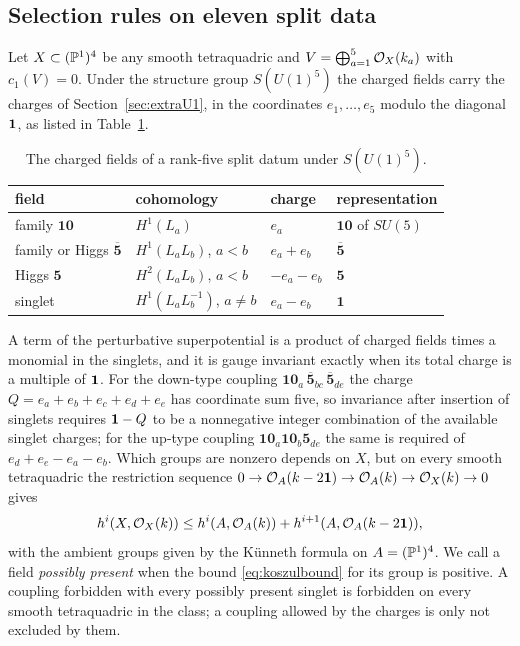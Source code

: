 \subsection{Selection rules on eleven split data}\label{sec:eleven}
Let $X\subset(\mathbb{P}^1)^4$ be any smooth tetraquadric and $V=\bigoplus_{a=1}^5
\mathcal{O}_X(k_a)$ with $c_1(V)=0$. Under the structure group $S(U(1)^5)$ the
charged fields carry the charges of Section~\ref{sec:extraU1}, in the
coordinates $e_1,\dots,e_5$ modulo the diagonal $\mathbf{1}$, as listed in
Table~\ref{tab:charges}.
\begin{table}[t]\small\centering
\caption{The charged fields of a rank-five split datum under
$S(U(1)^5)$.}\label{tab:charges}
\begin{tabular}{@{}llll@{}}
\toprule
field & cohomology & charge & representation\\\midrule
family $\mathbf{10}$ & $H^1(L_a)$ & $e_a$ & $\mathbf{10}$ of $SU(5)$\\
family or Higgs $\overline{\mathbf 5}$ & $H^1(L_aL_b)$, $a<b$ & $e_a+e_b$ & $\overline{\mathbf5}$\\
Higgs $\mathbf 5$ & $H^2(L_aL_b)$, $a<b$ & $-e_a-e_b$ & $\mathbf 5$\\
singlet & $H^1(L_aL_b^{-1})$, $a\ne b$ & $e_a-e_b$ & $\mathbf 1$\\
\bottomrule
\end{tabular}
\end{table}
A term of the perturbative superpotential is a product of charged fields
times a monomial in the singlets, and it is gauge invariant exactly when
its total charge is a multiple of $\mathbf{1}$. For the down-type coupling
$\mathbf{10}_a\,\overline{\mathbf5}_{bc}\,\overline{\mathbf5}_{de}$ the charge
$Q=e_a+e_b+e_c+e_d+e_e$ has coordinate sum five, so invariance after
insertion of singlets requires $\mathbf{1}-Q$ to be a nonnegative integer
combination of the available singlet charges; for the up-type coupling
$\mathbf{10}_a\mathbf{10}_b\mathbf 5_{de}$ the same is required of
$e_d+e_e-e_a-e_b$. Which groups are nonzero depends on $X$, but on every
smooth tetraquadric the restriction sequence
$0\to\mathcal{O}_A(k-2\mathbf{1})\to\mathcal{O}_A(k)\to\mathcal{O}_X(k)\to0$ gives
\begin{equation}\label{eq:koszulbound}
 h^i(X,\mathcal{O}_X(k))\le h^i(A,\mathcal{O}_A(k))+h^{i+1}(A,\mathcal{O}_A(k-2\mathbf{1})),
\end{equation}
with the ambient groups given by the K\"unneth formula on $A=(\mathbb{P}^1)^4$.
We call a field \emph{possibly present} when the bound
\eqref{eq:koszulbound} for its group is positive. A coupling forbidden
with every possibly present singlet is forbidden on every smooth
tetraquadric in the class; a coupling allowed by the charges is only not
excluded by them.

